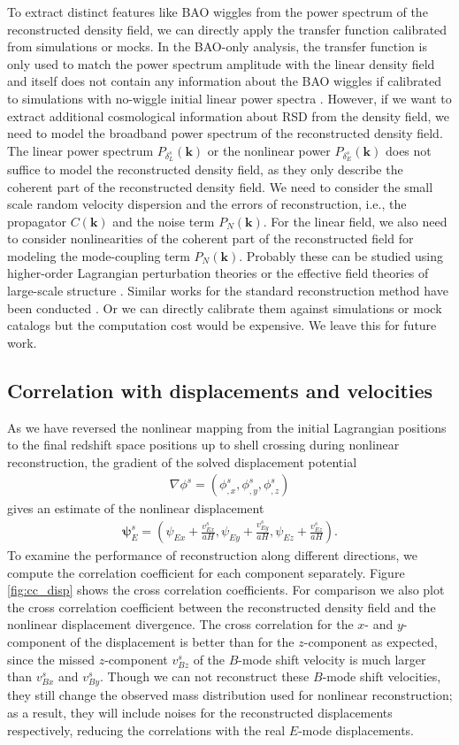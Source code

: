 \documentclass[aps,prx,twocolumn,superscriptaddress,groupedaddress,nofootinbib,amsfont]{revtex4}  %
\newcommand{\bea}{\begin{eqnarray}}
\newcommand{\eea}{\end{eqnarray}}
\newcommand{\bmp}{\bm{\psi}}
\newcommand{\bmk}{\bm{k}}
\begin{document}
To extract distinct features like BAO wiggles from the power spectrum of the
reconstructed density field, we can directly apply the transfer function 
calibrated from simulations or mocks. 
In the BAO-only analysis, the transfer function is only used to match the power 
spectrum amplitude with the linear density field and itself does not contain any
information about the BAO wiggles if calibrated to simulations with 
no-wiggle initial linear power spectra \cite{2017Marcel}.
However, if we want to extract additional cosmological information about RSD 
from the density field, we need to model the broadband power spectrum of the
reconstructed density field. 
The linear power spectrum $P_{\delta_L^s}(\bmk)$ or the nonlinear power $P_{\delta_E^s}(\bmk)$ does not suffice to model the reconstructed density field, as 
they only describe the coherent part of the reconstructed density field. 
We need to consider the small scale random velocity dispersion and the errors of
reconstruction, i.e., the propagator $C(\bmk)$ and the noise term $P_N(\bmk)$.
For the linear field, we also need to consider nonlinearities of the coherent 
part of the reconstructed field for modeling the mode-coupling term $P_N(\bmk)$.
Probably these can be studied using higher-order Lagrangian perturbation theories or the effective field theories of large-scale structure \cite{2016BSZ}.
Similar works for the standard reconstruction method have been conducted \cite{2009PWC,2009NWP,2015marcel,2015Martin,2016Seo,2017CKA}.
Or we can directly calibrate them against simulations or mock catalogs but the
computation cost would be expensive. We leave this for future work.


\subsection{Correlation with displacements and velocities}

As we have reversed the nonlinear mapping from the initial Lagrangian positions
to the final redshift space positions up to shell crossing during nonlinear 
reconstruction, the gradient of the solved displacement potential 
\bea
\nabla\phi^s=(\phi_{,x}^s,\phi_{,y}^s,\phi_{,z}^s)
\eea
gives an estimate of the nonlinear displacement
\bea
\bmp_E^s=(\psi_{Ex}+\frac{v_{Ex}^s}{aH},\psi_{Ey}+\frac{v_{Ey}^s}{aH},\psi_{Ez}+\frac{v_{Ez}^s}{aH}).
\eea
To examine the performance of reconstruction along different directions, we 
compute the correlation coefficient for each component separately. 
Figure \ref{fig:cc_disp} shows the cross correlation coefficients. 
For comparison we also plot the cross correlation coefficient between the 
reconstructed density field and the nonlinear displacement divergence.
The cross correlation for the $x$- and $y$-component of the displacement is
better than for the $z$-component as expected, since the missed $z$-component 
$v_{Bz}^s$ of the $B$-mode shift velocity is much larger than $v_{Bx}^s$ and 
$v_{By}^s$. Though we can not reconstruct these $B$-mode shift velocities, they
still change the observed mass distribution used for nonlinear reconstruction; 
as a result, they will include noises for the reconstructed displacements 
respectively, reducing the correlations with the real $E$-mode displacements. 
\end{document}
